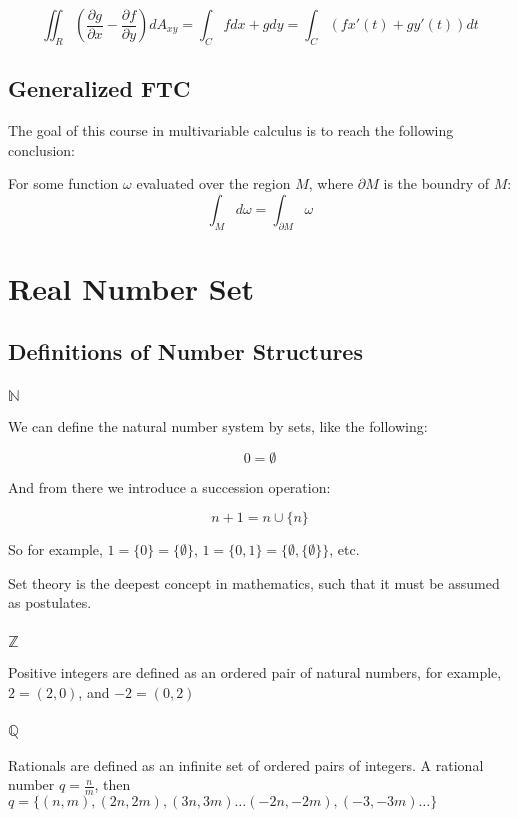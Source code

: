 \documentclass[11 pt, twoside]{article}
\begin{document}
$$\iint_R (\frac{\partial g}{\partial x} - \frac{\partial f}{\partial y}) dA_{xy} =
\int_C fdx + gdy = \int_C (fx'(t) + gy'(t))dt$$

\subsection{Generalized FTC}

The goal of this course in multivariable calculus is to reach the following
conclusion:

For some function $\omega$ evaluated over the region $M$, where $\partial M$ is the boundry of $M$:
$$\int_M d\omega = \int_{\partial M} \omega$$

\section{Real Number Set}

\subsection{Definitions of Number Structures}
\subsubsection{$\mathbb{N}$}
We can define the natural number system by sets, like the following:

$$0 = \emptyset$$

\noindent And from there we introduce a succession operation:

$$n + 1 = n \cup \{n\}$$

\noindent So for example, $1 = \{0\} = \{\emptyset\}$, $1 = \{0, 1\} = \{\emptyset,
\{\emptyset\}\}$, etc.

\noindent Set theory is the deepest concept in mathematics, such that it must be assumed as postulates.

\subsubsection{$\mathbb{Z}$}
Positive integers are defined as an ordered pair of natural numbers, for
example, $2 = (2, 0)$, and $-2 = (0, 2)$

\subsubsection{$\mathbb{Q}$}
Rationals are defined as an infinite set of ordered pairs of integers.
A rational number $q = \frac{n}{m}$, then $q = \{(n, m), (2n, 2m), (3n, 3m)
\dots (-2n, -2m), (-3, -3m) \dots\}$
\end{document}
